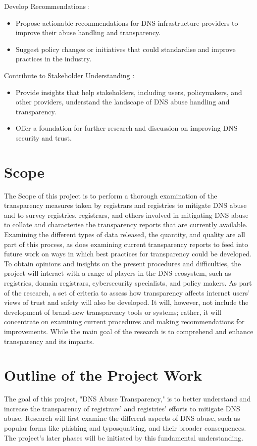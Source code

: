 Develop Recommendations :

\begin{itemize}
  \item Propose actionable recommendations for DNS infrastructure providers to improve their abuse handling and transparency.
  \item Suggest policy changes or initiatives that could standardise and improve practices in the industry.
\end{itemize}

Contribute to Stakeholder Understanding : 

\begin{itemize}
  \item Provide insights that help stakeholders, including users, policymakers, and other providers, understand the landscape of DNS abuse handling and transparency.
  \item Offer a foundation for further research and discussion on improving DNS security and trust.
\end{itemize}

\section{Scope}	
The Scope of this project is to perform a thorough examination of the transparency measures taken by registrars and registries to mitigate DNS abuse and to survey registries, registrars, and others involved in mitigating DNS abuse to collate and characterise the transparency reports that are currently available. Examining the different types of data released, the quantity, and quality are all part of this process, as does examining current transparency reports to feed into future work on ways in which best practices for transparency could be developed. To obtain opinions and insights on the present procedures and difficulties, the project will interact with a range of players in the DNS ecosystem, such as registries, domain registrars, cybersecurity specialists, and policy makers. As part of the research, a set of criteria to assess how transparency affects internet users' views of trust and safety will also be developed. It will, however, not include the development of brand-new transparency tools or systems; rather, it will concentrate on examining current procedures and making recommendations for improvements. While the main goal of the research is to comprehend and enhance transparency and its impacts. 

\section{ Outline of the Project Work} 
The goal of this project, "DNS Abuse Transparency," is to better understand and increase the transparency of registrars' and registries' efforts to mitigate DNS abuse. Research will first examine the different aspects of DNS abuse, such as popular forms like phishing and typosquatting, and their broader consequences. The project's later phases will be initiated by this fundamental understanding.

